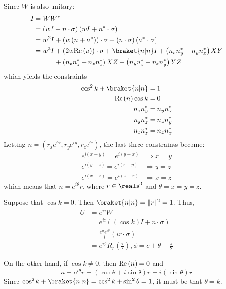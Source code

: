 \begin{enumerate}
%
Since $W$ is also unitary:
%
\begin{align}
I &= W W^* \\
&= \left( w I + n \cdot \sigma \right) \left( w I + n^* \cdot \sigma \right) \\
&= w^2 I + \left( w \left( n + n^* \right) \right) \cdot \sigma + \left( n \cdot \sigma \right) \left( n^* \cdot \sigma \right) \\
&= w^2 I + \left( 2 w \re{n} \right) \cdot \sigma + \braket{n|n} I +\left( n_x n_y^* - n_y n_x^* \right) XY \notag \\
&\phantom{{}= w^2 I} + \left( n_x n_z^* - n_z n_x^* \right) XZ + \left( n_y n_z^* - n_z n_y^* \right) YZ
\end{align}
%
which yields the constraints
%
\begin{align}
\cos^2 k + \braket{n|n} &= 1 \\
\re{n} \cos k &= 0 \\
n_x n_y^* &= n_y n_x^* \\
n_y n_z^* &= n_z n_y^* \\
n_x n_z^* &= n_z n_x^*
\end{align}
%
Letting $n = \left( r_x e^{ix}, r_y e^{iy}, r_z e^{iz} \right)$, the last three constraints become:
%
\begin{align}
e^{i \left( x - y \right)} = e^{i \left( y - x \right)} &\Rightarrow x = y \\
e^{i \left( y - z \right)} = e^{i \left( z - y \right)} &\Rightarrow y = z \\
e^{i \left( x - z \right)} = e^{i \left( z - x \right)} &\Rightarrow x = z
\end{align}
%
which means that $n = e^{i \theta} r$, where $r \in \reals^3$ and $\theta = x = y = z$.
%
\par Suppose that $\cos k = 0$.
%
Then $\braket{n|n} = \lVert r \rVert ^2 = 1$.
%
Thus,
%
\begin{align}
U &= e^{ic} W \\
&= e^{ic} \left( \left( \cos k \right) I + n \cdot \sigma \right) \\
&= \frac{e^{ic} e^{i \theta}}{i} \left( i r \cdot \sigma \right) \\
&= e^{i \phi} R_r \left( \frac{\pi}{2} \right), \phi = c + \theta - \frac{\pi}{2}
\end{align}
%
\par On the other hand, if $\cos k \ne 0$, then $\mathrm{Re} \left( n \right) = 0$ and
$$
n = e^{i \theta} r = \left( \cos \theta + i \sin \theta \right) r = i \left( \sin \theta \right) r
$$
%
Since $\cos^2 k + \braket{n|n} = \cos^2 k + \sin^2 \theta = 1$, it must be that $\theta = k$.

\end{enumerate}
